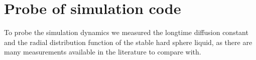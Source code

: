 






\section{Probe of simulation code}
\label{sec:probe}
To probe the simulation dynamics we measured the longtime diffusion constant and the radial distribution function of the stable hard sphere liquid, as there are many measurements available in the literature to compare with.

